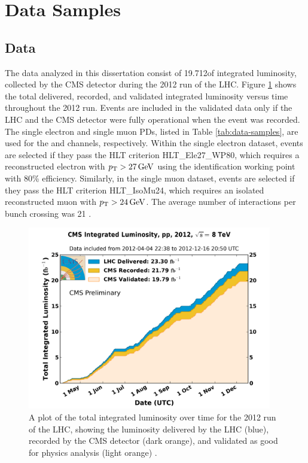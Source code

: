 \section{Data Samples}

\subsection{Data
\label{sec:obsdatasamples}}

The data analyzed in this dissertation consist of 19.712\fbinv of integrated luminosity, collected by the CMS detector during the 2012 run of the LHC. Figure \ref{fig:lumipublic-dqm} shows the total delivered, recorded, and validated integrated luminosity versus time throughout the 2012 run. Events are included in the validated data only if the LHC and the CMS detector were fully operational when the event was recorded. The single electron and single muon PDs, listed in Table \ref{tab:data-samples}, are used for the \etau and \mutau channels, respectively. Within the single electron dataset, events are selected if they pass the HLT criterion HLT\_Ele27\_WP80, which requires a reconstructed electron with $p_{\mathrm{T}}>27\,\text{Ge\hspace{-.08em}V}$ using the identification working point with 80\% efficiency. Similarly, in the single muon dataset, events are selected if they pass the HLT criterion HLT\_IsoMu24, which requires an isolated reconstructed muon with $p_{\mathrm{T}}>24\,\text{Ge\hspace{-.08em}V}$. The average number of interactions per bunch crossing was 21 \cite{LumiPublic}.

\begin{figure}[hbt]
\begin{center}
\includegraphics[width=0.95\textwidth]{figures/int_lumi_per_day_cumulative_pp_2012_SummerConf.png}
\caption{A plot of the total integrated luminosity over time for the 2012 run of the LHC, showing the luminosity delivered by the LHC (blue), recorded by the CMS detector (dark orange), and validated as good for physics analysis (light orange) \cite{DataQuality}.}
\label{fig:lumipublic-dqm}
\end{center}
\end{figure}

